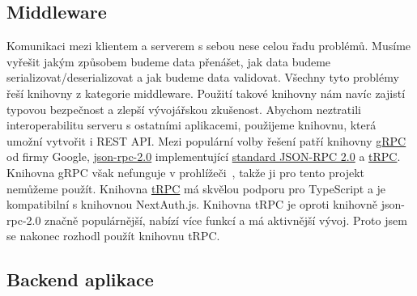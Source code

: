 \subsection{Middleware}\label{subsec:middleware}

Komunikaci mezi klientem a serverem s sebou nese celou řadu problémů.
Musíme vyřešit jakým způsobem budeme data přenášet, jak data budeme serializovat\slash deserializovat a jak budeme data validovat.
Všechny tyto problémy řeší knihovny z kategorie middleware.
Použití takové knihovny nám navíc zajistí typovou bezpečnost a zlepší vývojářskou zkušenost.
Abychom neztratili interoperabilitu serveru s ostatními aplikacemi, použijeme knihovnu, která umožní vytvořit i REST API\@.
Mezi populární volby řešení patří knihovny \href{https://grpc.io/}{gRPC} od firmy Google, \href{https://www.npmjs.com/package/json-rpc-2.0}{json-rpc-2.0} implementující \href{https://www.jsonrpc.org/specification}{standard JSON-RPC 2.0}  a \href{https://trpc.io/}{tRPC}.
Knihovna gRPC však nefunguje v prohlížeči~\cite{state-of-grpc}, takže ji pro tento projekt nemůžeme použít.
Knihovna \href{https://trpc.io/}{tRPC} má skvělou podporu pro TypeScript a je kompatibilní s knihovnou NextAuth.js.
Knihovna tRPC je oproti knihovně json-rpc-2.0 značně populárnější, nabízí více funkcí a má aktivnější vývoj.
Proto jsem se nakonec rozhodl použít knihovnu tRPC\@.

\subsection{Backend aplikace}\label{subsec:backend-aplikace}

